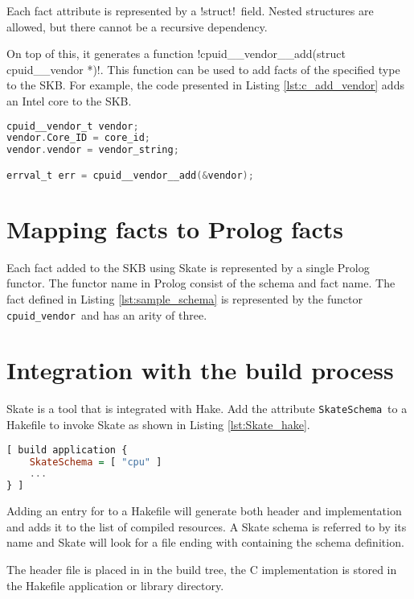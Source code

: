 \documentclass[a4paper,11pt,twoside]{report}
\begin{document}
{{Each fact attribute is represented by a \ccode!struct!~field. Nested structures are
allowed, but there cannot be a recursive dependency.

On top of this, it generates a function
\ccode!cpuid__vendor__add(struct cpuid__vendor *)!.
This function can be used to add facts of the specified type to the SKB. For
example, the code presented in Listing \ref{lst:c_add_vendor} adds an Intel core
to the SKB.

\begin{lstlisting}[caption={C example to add a vendor fact.},
label={lst:c_add_vendor}, language=C]
cpuid__vendor_t vendor;
vendor.Core_ID = core_id;
vendor.vendor = vendor_string;

errval_t err = cpuid__vendor__add(&vendor);
\end{lstlisting}

\section{Mapping facts to Prolog facts}

Each fact added to the SKB using Skate is represented by a single Prolog
functor.  The functor name in Prolog consist of the schema and fact name.  The
fact defined in Listing \ref{lst:sample_schema} is represented by the functor
\lstinline!cpuid_vendor!~and has an arity of three.

\section{Integration with the build process}

Skate is a tool that is integrated with Hake. Add the attribute
\lstinline!SkateSchema!~to a Hakefile to invoke Skate as shown in Listing
\ref{lst:Skate_hake}.

\begin{lstlisting}[caption={Including Skate schemata in Hake},
label={lst:Skate_hake}, language=Haskell]
[ build application {
    SkateSchema = [ "cpu" ]
    ... 
} ]
\end{lstlisting}

Adding an entry for  to a Hakefile will generate both
header and implementation and adds it to the list of compiled resources. A
Skate schema is referred to by its name and Skate will look for a file
ending with  containing the schema definition.

The header file is placed in  in the build tree, the C
implementation is stored in the Hakefile application or library directory.

}}
\end{document}
